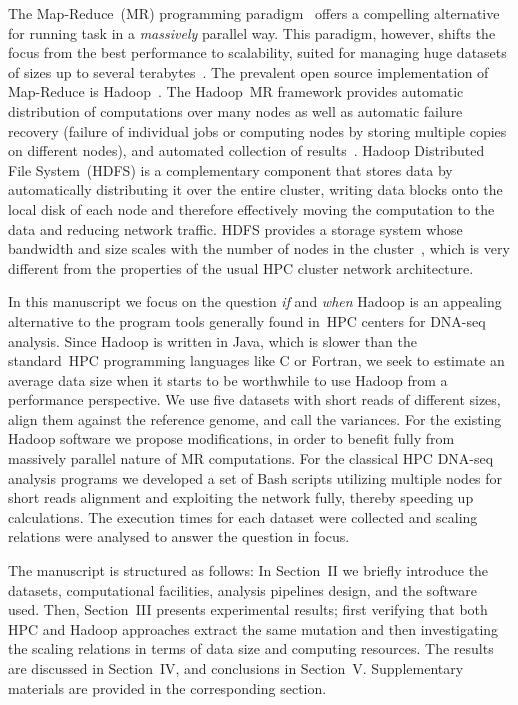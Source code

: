 \documentclass[11pt, oneside]{article}   	%
\begin{document}
The Map-Reduce~(MR) programming paradigm~\cite{hadoop} offers a compelling alternative for running task in a {\it massively} parallel way. This paradigm, however, shifts the focus from the best performance to scalability, suited for managing huge datasets of sizes up to several terabytes~\cite{lin2010}.
The prevalent open source implementation of Map-Reduce is Hadoop~\cite{hadoop,Hadoop:Guide}. 
The Hadoop~MR framework provides automatic distribution of computations over many nodes as well as automatic failure recovery (failure of individual jobs or computing nodes by storing multiple copies on different nodes), and automated collection of results~\cite{Hadoop:Guide}. Hadoop Distributed File System~(HDFS) is a complementary component that stores data by automatically distributing it over the entire cluster, writing data blocks onto the local disk of each node and therefore effectively moving the computation to the data and reducing network traffic. HDFS provides a storage system whose bandwidth and size scales with the number of nodes in the cluster~\cite{Sammer:2012}, which is very different from the properties of the usual HPC cluster network architecture. 

In this manuscript we focus on the question {\it if} and {\it when} Hadoop is an appealing alternative to the program tools generally found in~HPC centers for DNA-seq analysis. Since Hadoop is written in Java, which is slower than the standard~HPC programming languages like C or Fortran, we seek to estimate an average data size when it starts to be worthwhile to use Hadoop from a performance perspective. We use five datasets with short reads of different sizes, align them against the reference genome, and call the variances.
For the existing Hadoop  software we propose modifications, in order to benefit fully from massively parallel nature of MR computations. 
For the classical HPC DNA-seq analysis programs we developed a set of Bash scripts utilizing multiple nodes for short reads alignment and exploiting the network fully, thereby speeding up calculations.
The execution times for each dataset were collected and scaling relations were analysed to answer the question in focus.

The manuscript is structured as follows: In Section~II we briefly introduce the datasets, computational facilities, analysis pipelines design,  and the software used. Then, Section~III presents experimental results; first verifying that both HPC and Hadoop approaches extract the same mutation and then investigating the scaling relations in terms of data size and computing resources. The results are discussed in Section~IV, and conclusions in Section~V. Supplementary materials are provided in the corresponding section.
\end{document}
